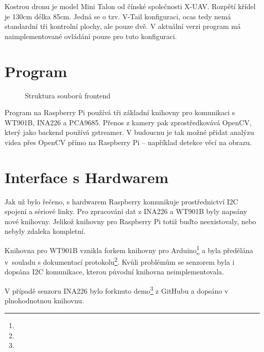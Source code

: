 \documentclass[a4paper,oneside,12pt]{report}
\begin{document}
Kostrou dronu je model Mini Talon od čínské společnosti X-UAV.
Rozpětí křídel je 130cm délka 85cm.
Jedná se o tzv. V-Tail konfiguraci, ocas tedy nemá standardní tři kontrolní plochy, ale pouze dvě.
V aktuální verzi program má naimplementované ovládání pouze pro tuto konfiguraci.

\newpage

\section{Program}

\begin{figure}[h]
  \caption[Struktura souborů na dronu, vlastní tvorba]{Struktura souborů frontend}
\end{figure}

Program na Raspberry Pi používá tři základní knihovny pro komunikaci s WT901B, INA226 a PCA9685.
Přenos z kamery pak zprostředkovává OpenCV, který jako backend používá gstreamer.
V budoucnu je tak možné přidat analýzu videa přes OpenCV přímo na Raspberry Pi -- například detekce věcí na obrazu.

\section{Interface s Hardwarem}

Jak už bylo řečeno, s hardwarem Raspberry komunikuje prostřednictví I2C spojení a sériové linky.
Pro zpracování dat z INA226 a WT901B byly napsány nové knihovny.
Jelikož knihovny pro Raspberry Pi totiž buďto neexistovaly, nebo nebyly zdaleka kompletní.

Knihovna pro WT901B vznikla forkem knihovny pro Arduino\footnote{} a byla předělána v~souladu s dokumentací protokolu\footnote{}.
Kvůli problémům se senzorem byla i dopsána I2C komunikace, kterou původní knihovna neimplementovala.

V případě senzoru INA226 bylo forknuto demo\footnote{} z GitHubu a dopsáno v plnohodnotnou knihovnu.
\end{document}
